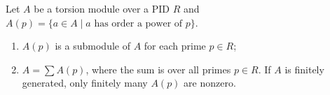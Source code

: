 Let $A$ be a torsion module over a PID $R$ and $A(p) = \{a \in A \mid a \text{ has order a power of } p\}$.
\begin{enumerate}
\item[(i)] $A(p)$ is a submodule of $A$ for each prime $p \in R$;
\item[(ii)] $A = \sum A(p)$, where the sum is over all primes $p \in R$. If $A$ is finitely generated, only finitely many $A(p)$ are nonzero.
\end{enumerate}
